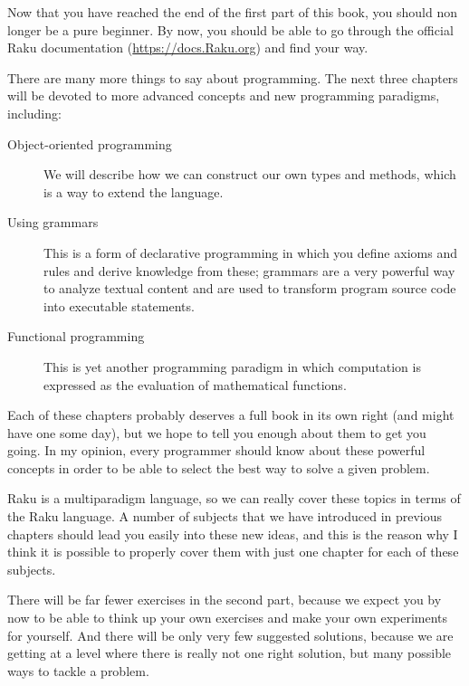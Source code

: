 %

Now that you have reached the end of the first part 
of this book, you should non longer be a pure beginner. 
By now, you should be able to go through the official 
Raku documentation (\url{https://docs.Raku.org}) 
and find your way. 

There are many more things to say about programming. 
The next three chapters will be devoted to more 
advanced concepts and new programming paradigms, including:
\begin{description}

\item[Object-oriented programming] We will describe how 
we can construct our own types and methods, which 
is a way to extend the language.

\item[Using grammars] This is a form of declarative 
programming in which you define axioms and rules 
and derive knowledge from these; grammars are a 
very powerful way to analyze textual content and 
are used to transform program source code into 
executable statements.

\item[Functional programming] This is yet another programming 
paradigm in which computation is expressed as the 
evaluation of mathematical functions.
\end{description}

Each of these chapters probably deserves a full 
book in its own right (and might have one some day), 
but we hope to tell you enough about them to get you 
going. In my opinion, every programmer should know 
about these powerful concepts in order to be able 
to select the best way to solve a given problem.

Raku is a multiparadigm language, so we can 
really cover these topics in terms of the Raku 
language. A number of subjects that we have 
introduced in previous chapters should lead you 
easily into these new ideas, and this is the 
reason why I think it is possible to properly cover 
them with just one chapter for each of these subjects.

There will be far fewer exercises in the second part, 
because we expect you by now to be able to think up 
your own exercises and make your own experiments for 
yourself. And there will be only very few suggested solutions, 
because we are getting at a level where there is really not  
one right solution, but many possible ways to tackle 
a problem.

